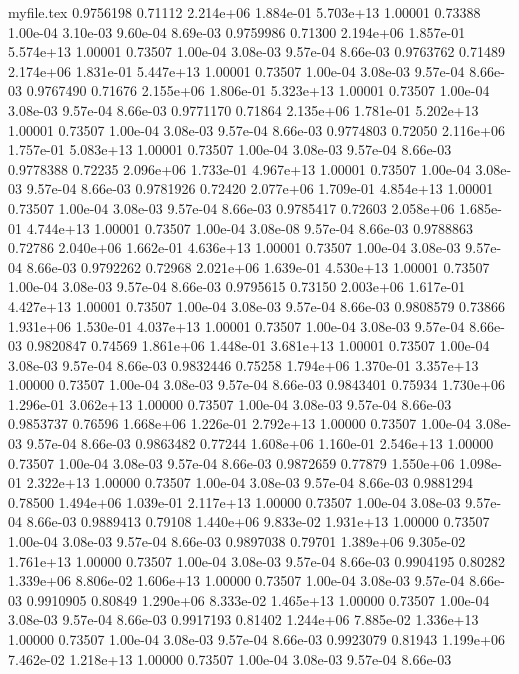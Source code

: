 \begin{filecontents}{myfile.tex}
0.9756198 0.71112 2.214e+06 1.884e-01 5.703e+13 1.00001 0.73388 1.00e-04 3.10e-03 9.60e-04 8.69e-03
0.9759986 0.71300 2.194e+06 1.857e-01 5.574e+13 1.00001 0.73507 1.00e-04 3.08e-03 9.57e-04 8.66e-03
0.9763762 0.71489 2.174e+06 1.831e-01 5.447e+13 1.00001 0.73507 1.00e-04 3.08e-03 9.57e-04 8.66e-03
0.9767490 0.71676 2.155e+06 1.806e-01 5.323e+13 1.00001 0.73507 1.00e-04 3.08e-03 9.57e-04 8.66e-03
0.9771170 0.71864 2.135e+06 1.781e-01 5.202e+13 1.00001 0.73507 1.00e-04 3.08e-03 9.57e-04 8.66e-03
0.9774803 0.72050 2.116e+06 1.757e-01 5.083e+13 1.00001 0.73507 1.00e-04 3.08e-03 9.57e-04 8.66e-03
0.9778388 0.72235 2.096e+06 1.733e-01 4.967e+13 1.00001 0.73507 1.00e-04 3.08e-03 9.57e-04 8.66e-03
0.9781926 0.72420 2.077e+06 1.709e-01 4.854e+13 1.00001 0.73507 1.00e-04 3.08e-03 9.57e-04 8.66e-03
0.9785417 0.72603 2.058e+06 1.685e-01 4.744e+13 1.00001 0.73507 1.00e-04 3.08e-08 9.57e-04 8.66e-03
0.9788863 0.72786 2.040e+06 1.662e-01 4.636e+13 1.00001 0.73507 1.00e-04 3.08e-03 9.57e-04 8.66e-03
0.9792262 0.72968 2.021e+06 1.639e-01 4.530e+13 1.00001 0.73507 1.00e-04 3.08e-03 9.57e-04 8.66e-03
0.9795615 0.73150 2.003e+06 1.617e-01 4.427e+13 1.00001 0.73507 1.00e-04 3.08e-03 9.57e-04 8.66e-03
0.9808579 0.73866 1.931e+06 1.530e-01 4.037e+13 1.00001 0.73507 1.00e-04 3.08e-03 9.57e-04 8.66e-03
0.9820847 0.74569 1.861e+06 1.448e-01 3.681e+13 1.00001 0.73507 1.00e-04 3.08e-03 9.57e-04 8.66e-03
0.9832446 0.75258 1.794e+06 1.370e-01 3.357e+13 1.00000 0.73507 1.00e-04 3.08e-03 9.57e-04 8.66e-03
0.9843401 0.75934 1.730e+06 1.296e-01 3.062e+13 1.00000 0.73507 1.00e-04 3.08e-03 9.57e-04 8.66e-03
0.9853737 0.76596 1.668e+06 1.226e-01 2.792e+13 1.00000 0.73507 1.00e-04 3.08e-03 9.57e-04 8.66e-03
0.9863482 0.77244 1.608e+06 1.160e-01 2.546e+13 1.00000 0.73507 1.00e-04 3.08e-03 9.57e-04 8.66e-03
0.9872659 0.77879 1.550e+06 1.098e-01 2.322e+13 1.00000 0.73507 1.00e-04 3.08e-03 9.57e-04 8.66e-03
0.9881294 0.78500 1.494e+06 1.039e-01 2.117e+13 1.00000 0.73507 1.00e-04 3.08e-03 9.57e-04 8.66e-03
0.9889413 0.79108 1.440e+06 9.833e-02 1.931e+13 1.00000 0.73507 1.00e-04 3.08e-03 9.57e-04 8.66e-03
0.9897038 0.79701 1.389e+06 9.305e-02 1.761e+13 1.00000 0.73507 1.00e-04 3.08e-03 9.57e-04 8.66e-03
0.9904195 0.80282 1.339e+06 8.806e-02 1.606e+13 1.00000 0.73507 1.00e-04 3.08e-03 9.57e-04 8.66e-03
0.9910905 0.80849 1.290e+06 8.333e-02 1.465e+13 1.00000 0.73507 1.00e-04 3.08e-03 9.57e-04 8.66e-03
0.9917193 0.81402 1.244e+06 7.885e-02 1.336e+13 1.00000 0.73507 1.00e-04 3.08e-03 9.57e-04 8.66e-03
0.9923079 0.81943 1.199e+06 7.462e-02 1.218e+13 1.00000 0.73507 1.00e-04 3.08e-03 9.57e-04 8.66e-03

\end{filecontents}
